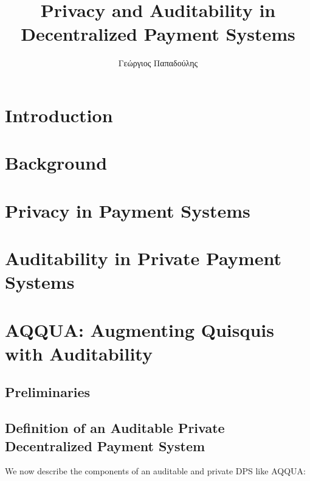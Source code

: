 \documentclass[a4paper, thm-restate]{book}
\title{Privacy and Auditability in Decentralized Payment Systems}
\author{Γεώργιος Παπαδούλης }
\begin{document}
    
    \sle
    
    \newpage

    \tableofcontents
    
    \chapter{Introduction}
        

    \chapter{Background}
        
        
    
    \chapter{Privacy in Payment Systems}
        
        

    \chapter{Auditability in Private Payment Systems}
    
    

    \chapter{AQQUA: Augmenting Quisquis with Auditability}
        
        \section{Preliminaries}
        
        
        \section{Definition of an Auditable Private Decentralized Payment System}
        We now describe the components of an auditable and private DPS like AQQUA:

        
        
        
        
        
        
\end{document}
